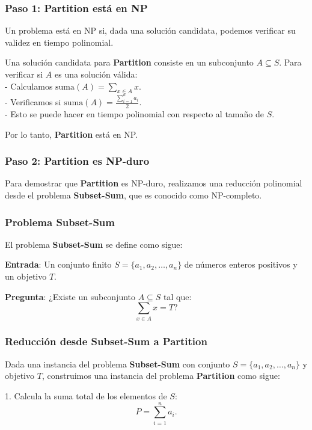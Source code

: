 \documentclass{report}
\begin{document}
	\subsubsection*{Paso 1: Partition está en NP}
	
	Un problema está en NP si, dada una solución candidata, podemos verificar su validez en tiempo polinomial.
	
	Una solución candidata para \textbf{Partition} consiste en un subconjunto $ A \subseteq S $. Para verificar si $ A $ es una solución válida:\\
	- Calculamos $ \text{suma}(A) = \sum_{x \in A} x $.\\
	- Verificamos si $ \text{suma}(A) = \frac{\sum_{i=1}^n a_i}{2} $.\\
	- Esto se puede hacer en tiempo polinomial con respecto al tamaño de $ S $.
	
	Por lo tanto, \textbf{Partition} está en NP.
	
	\subsubsection*{Paso 2: Partition es NP-duro}
	
	Para demostrar que \textbf{Partition} es NP-duro, realizamos una reducción polinomial desde el problema \textbf{Subset-Sum}, que es conocido como NP-completo.
	
	\subsubsection*{Problema Subset-Sum}
	
	El problema \textbf{Subset-Sum} se define como sigue:
	
	\textbf{Entrada}: Un conjunto finito $ S = \{a_1, a_2, \dots, a_n\} $ de números enteros positivos y un objetivo $ T $.
	
	\textbf{Pregunta}: ¿Existe un subconjunto $ A \subseteq S $ tal que:
	\[
	\sum_{x \in A} x = T?
	\]
	
	\subsubsection*{Reducción desde Subset-Sum a Partition}
	
	Dada una instancia del problema \textbf{Subset-Sum} con conjunto $ S = \{a_1, a_2, \dots, a_n\} $ y objetivo $ T $, construimos una instancia del problema \textbf{Partition} como sigue:
	
	1. Calcula la suma total de los elementos de $ S $:
	\[
	P = \sum_{i=1}^n a_i.
	\]
	
\end{document}
